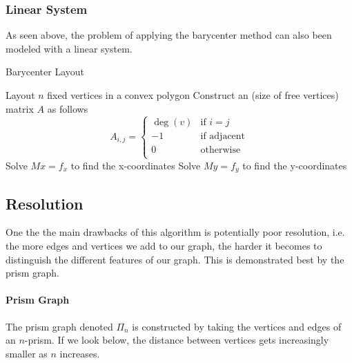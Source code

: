 \documentclass[11pt]{article}
\begin{document}
\subsubsection{Linear System}
As seen above, the problem of applying the barycenter method can also been modeled with a linear system.

\begin{algorithm}
    \caption{Barycenter Layout}\label{euclid}
    \begin{algorithmic}[1]       
        \State Layout $n$ fixed vertices in a convex polygon
        \State Construct an (size of free vertices) matrix $A$ as follows
        \[
        A_{i, j} = \begin{cases}
            \deg(v) &{\text{if $i = j$}} \\
            -1      &{\text{if adjacent}} \\
            0       &{\text{otherwise}} \\
        \end{cases}
        \]
        \State Solve $Mx = f_x$ to find the x-coordinates
        \State Solve $My = f_y$ to find the y-coordinates
        \EndProcedure
    \end{algorithmic}
\end{algorithm}

\subsection{Resolution}
One the the main drawbacks of this algorithm is potentially poor resolution, i.e. the more edges and vertices we add to our graph, the harder it becomes to distinguish the different features of our graph. This is demonstrated best by the prism graph.

\paragraph{Prism Graph}
The prism graph denoted $\Pi_{n}$ is constructed by taking the vertices and edges of an $n$-prism. If we look below, the distance between vertices gets increasingly smaller as $n$ increases.
\end{document}
